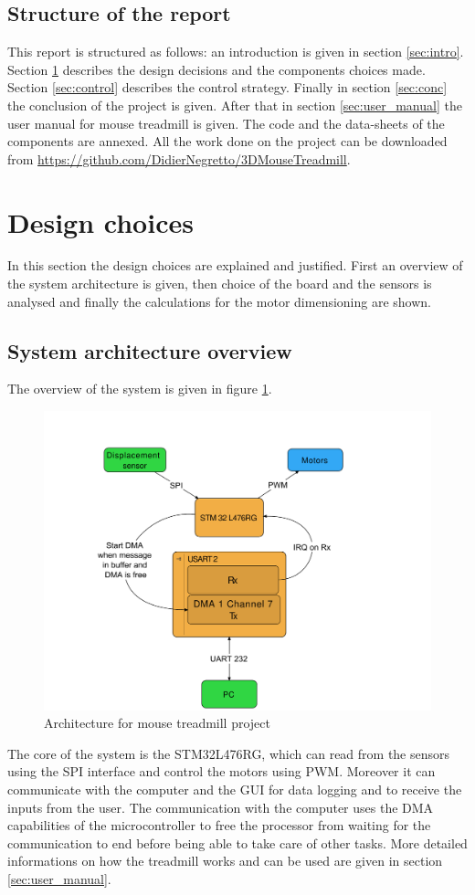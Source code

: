 \documentclass[12pt,a4paper, twoside]{article}
\begin{document}
\subsection{Structure of the report}
This report is structured as follows: an introduction is given in section \ref{sec:intro}. Section \ref{sec:design} describes the design decisions and the components choices made. Section \ref{sec:control} describes the control strategy.
Finally in section \ref{sec:conc} the conclusion of the project is given. After that in section \ref{sec:user_manual} the user manual for mouse treadmill is given. The code and the data-sheets of the components are annexed. All the work done on the project can be downloaded from \url{https://github.com/DidierNegretto/3DMouseTreadmill}.
\section{Design choices}\label{sec:design}
In this section the design choices are explained and justified. First an overview of the system architecture is given, then choice of the board and the sensors is analysed and finally the calculations for the motor dimensioning are shown.
\subsection{System architecture overview} \label{sec:archi}
The overview of the system is given in figure \ref{fig:arch}.
\begin{figure}[H]
	\centering
	\includegraphics[width=0.9\linewidth]{fig/archi.pdf}
	\caption{Architecture for mouse treadmill project}
	\label{fig:arch}
\end{figure}
The core of the system is the STM32L476RG, which can read from the sensors using the SPI interface and control the motors using PWM. Moreover it can communicate with the computer and the GUI for data logging and to receive the inputs from the user. The communication with the computer uses the DMA capabilities of the microcontroller to free the processor from waiting for the communication to end before being able to take care of other tasks. More detailed informations on how the treadmill works and can be used are given in section \ref{sec:user_manual}.
\end{document}
